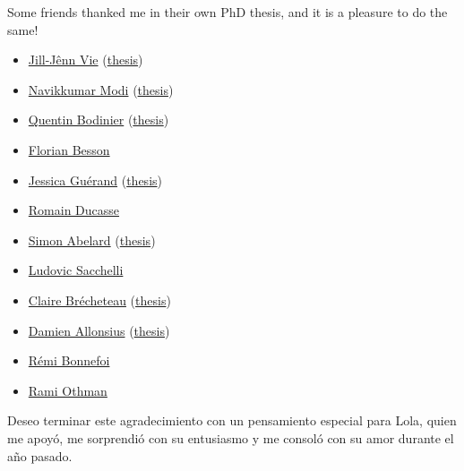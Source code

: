 \begin{acknowledgements}
Some friends thanked me in their own PhD thesis, and it is a pleasure to do the same!
%
\begin{itemize}
\tightlist
\item
  \href{http://jill-jenn.net/}{Jill-Jênn Vie}
  (\href{http://jiji.cat/cat.pdf}{thesis})
\item
  \href{https://navikkumarmodi.wordpress.com/}{Navikkumar Modi}
  (\href{https://tel.archives-ouvertes.fr/tel-01668536/document}{thesis})
\item
  \href{https://quentinbodinier.wordpress.com/}{Quentin Bodinier}
  (\href{https://www.theses.fr/2017REN1S091}{thesis})
\item
  \href{https://paris-sorbonne.academia.edu/FBesson}{Florian Besson}
\item
  \href{https://sites.google.com/view/guerand}{Jessica Guérand}
  (\href{https://drive.google.com/open?id=17CBibM8ZlzIbyVxpxktK3j5rNePALUs8}{thesis})
\item
  \href{https://sites.google.com/view/ducasse/}{Romain Ducasse}
\item
  \href{https://members.loria.fr/SAbelard/}{Simon Abelard}
  (\href{https://members.loria.fr/SAbelard/theseabelard.pdf}{thesis})
\item
  \href{http://www.cmap.polytechnique.fr/~sacchelli/}{Ludovic Sacchelli}
\item
  \href{http://pages.saclay.inria.fr/claire.brecheteau/}{Claire
  Brécheteau}
  (\href{https://hal.archives-ouvertes.fr/tel-01897787/document}{thesis})
\item
  \href{http://www.i2m.univ-amu.fr/perso/damien.allonsius/}{Damien
  Allonsius}
  (\href{http://www.i2m.univ-amu.fr/perso/damien.allonsius/documents/recherche/these/Main.pdf}{thesis})
\item
  \href{https://remibonnefoi.wordpress.com/}{Rémi Bonnefoi}
\item
  \href{https://remibonnefoi.wordpress.com/}{Rami Othman}
\end{itemize}

Deseo terminar este agradecimiento con un pensamiento especial para Lola, quien me apoyó, me sorprendió con su entusiasmo y me consoló con su amor durante el año pasado.

\end{acknowledgements}
